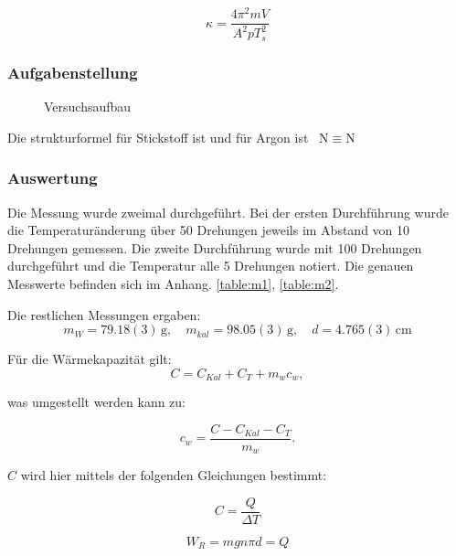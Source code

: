 \documentclass[11pt,a4paper]{article}
\begin{document}
\begin{equation}\tag{F1}
	\kappa = \frac{4 \pi^2 mV}{A^2 p T^2_s}
	\label{F:0}
\end{equation}
\subsubsection{Aufgabenstellung}

\begin{figure}[h]
\centering
{}
   \renewcommand\thefigure{B1}
\caption{Versuchsaufbau}
\label{JS1}
\end{figure}

Die strukturformel für Stickstoff ist  und für Argon ist  \ N$\equiv$N

\subsubsection{Auswertung}

Die Messung wurde zweimal durchgef\"uhrt. Bei der ersten Durchf\"uhrung wurde die Temperatur\"anderung \"uber 50 Drehungen jeweils im Abstand von 10 Drehungen gemessen. Die zweite Durchf\"uhrung wurde mit 100 Drehungen durchgef\"uhrt und die Temperatur alle 5 Drehungen notiert. Die genauen Messwerte befinden sich im Anhang. \ref{table:m1}, \ref{table:m2}.

Die restlichen Messungen ergaben: $$m_W = 79.18(3)\,\textrm{g}, \quad m_{kal} = 98.05(3)\,\textrm{g}, \quad d = 4.765(3)\,\textrm{cm}$$

F\"ur die W\"armekapazit\"at gilt:\\

\begin{equation}
C=C_{Kal}+C_T+m_wc_w,\label{eq1}
\end{equation}

was umgestellt werden kann zu:

\begin{equation}
c_w=\frac{C-C_{Kal}-C_T}{m_w}.\label{eq2}
\end{equation}

$C$ wird hier mittels der folgenden Gleichungen bestimmt:

\begin{equation}
C=\frac{Q}{\Delta T}
\end{equation}

\begin{equation}
W_R=mgn\pi d=Q
\end{equation}
\end{document}
